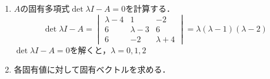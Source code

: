 \begin{souanswer}
\begin{enumerate}
\begin{itemize}
  \item $\ker{f}$の基底：$\begin{pmatrix}0\\ 2\\ 1\end{pmatrix}$
  \item $\ker{f}$の次元：$\dim{\ker{f}}= 1$
\end{itemize}
  階段行列の主成分は第一列と第二列にあるため，$A$の第一列と第二列のベクトルが$\img{f}$の基底を作る．
\begin{itemize}
  \item $\img{f}$の基底：$\begin{Bmatrix}\begin{pmatrix}4\\ -6\\ -6\end{pmatrix}, \begin{pmatrix}-1\\ 3\\ 2\end{pmatrix}\end{Bmatrix}$
  \item $\img{f}$の次元：$\dim{\img{f}}= \rank{A}= 2$
\end{itemize}
  \item $A$の固有多項式$\det{\lambda I- A}= 0$を計算する．
\begin{equation*}
  \det{\lambda I- A}= 
\begin{vmatrix}
  \lambda- 4& 1& -2\\
  6& \lambda- 3& 6\\
  6& -2& \lambda+ 4
\end{vmatrix}= \lambda(\lambda- 1)(\lambda- 2)
\end{equation*}
  $\det{\lambda I- A}= 0$を解くと，$\lambda= 0, 1, 2$
  \item 各固有値に対して固有ベクトルを求める．
\end{enumerate}
\end{souanswer}
